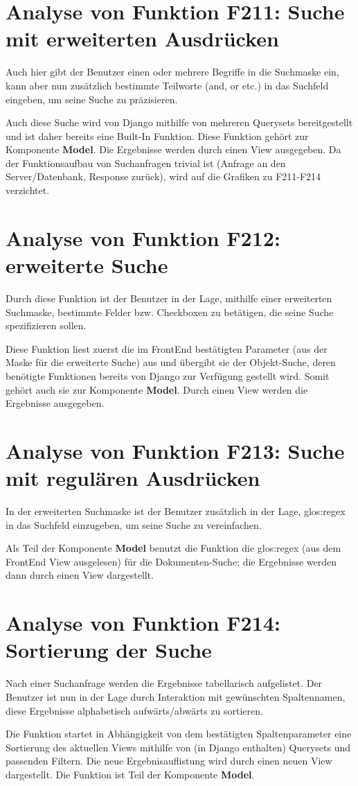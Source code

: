 \section{Analyse von Funktion F211: Suche mit erweiterten Ausdrücken}
Auch hier gibt der Benutzer einen oder mehrere Begriffe in die Suchmaske ein, kann aber nun zusätzlich bestimmte Teilworte (and, or etc.) in das Suchfeld eingeben, um seine Suche zu präzisieren.  

Auch diese Suche wird von Django mithilfe von mehreren Querysets bereitgestellt und ist daher bereits eine Built-In Funktion. Diese Funktion gehört zur Komponente \textbf{Model}. Die Ergebnisse werden durch einen View ausgegeben. 
Da der Funktionsaufbau von Suchanfragen trivial ist (Anfrage an den Server/Datenbank, Response zurück), wird auf die Grafiken zu F211-F214 verzichtet.   

\section{Analyse von Funktion F212: erweiterte Suche}
Durch diese Funktion ist der Benutzer in der Lage, mithilfe einer erweiterten Suchmaske, bestimmte Felder bzw. Checkboxen zu betätigen, die seine Suche spezifizieren sollen.
    
Diese Funktion liest zuerst die im FrontEnd bestätigten Parameter (aus der Maske für die erweiterte Suche) aus und übergibt sie der Objekt-Suche, deren benötigte Funktionen bereits von Django zur Verfügung gestellt wird. Somit gehört auch sie zur Komponente \textbf{Model}. Durch einen View werden die Ergebnisse ausgegeben. 

\section{Analyse von Funktion F213: Suche mit regulären Ausdrücken}
In der erweiterten Suchmaske ist der Benutzer zusätzlich in der Lage, \gls{glos:regex} in das Suchfeld einzugeben, um seine Suche zu vereinfachen. 

Als Teil der Komponente \textbf{Model} benutzt die Funktion die \gls{glos:regex} (aus dem FrontEnd View ausgelesen) für die Dokumenten-Suche; die Ergebnisse werden dann durch einen View dargestellt.
 
\section{Analyse von Funktion F214: Sortierung der Suche}
Nach einer Suchanfrage werden die Ergebnisse tabellarisch aufgelistet. Der Benutzer ist nun in der Lage durch Interaktion mit gewünschten Spaltennamen, diese Ergebnisse alphabetisch aufwärts/abwärts zu sortieren. 

Die Funktion startet in Abhängigkeit von dem bestätigten Spaltenparameter eine Sortierung des aktuellen Views mithilfe von (in Django enthalten) Querysets und passenden Filtern. Die neue Ergebnisauflistung wird durch einen neuen View dargestellt. Die Funktion ist Teil der Komponente \textbf{Model}. 




 